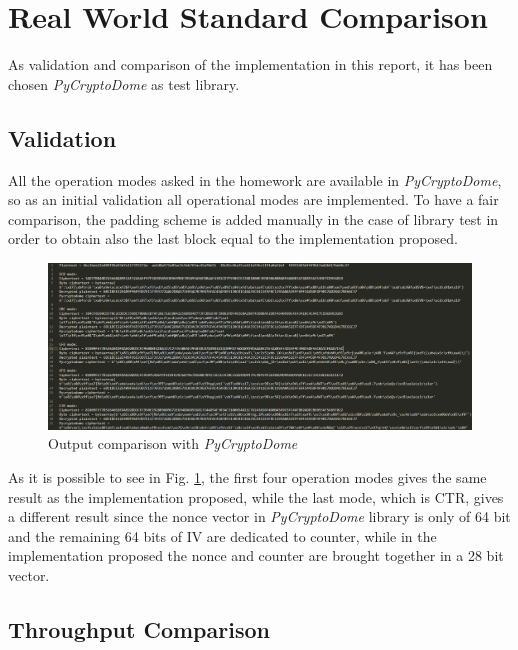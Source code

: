 \documentclass{article}
\begin{document}

\section{Real World Standard Comparison}

As validation and comparison of the implementation in this report, it has been chosen \textit{PyCryptoDome} as test library. 

\subsection{Validation}

All the operation modes asked in the homework are available in \textit{PyCryptoDome}, so as an initial validation all operational modes are implemented. To have a fair comparison, the padding scheme is added manually in the case of library test in order to obtain also the last block equal to the implementation proposed. 

\begin{figure}[H]
\centering
\includegraphics[width=1\linewidth]{images/output_comparison.png}
\caption{Output comparison with  \textit{PyCryptoDome}}
\label{fig:outputComparison}
\end{figure}

As it is possible to see in Fig. \ref{fig:outputComparison}, the first four operation modes gives the same result as the implementation proposed, while the last mode, which is CTR, gives a different result since the nonce vector in \textit{PyCryptoDome} library is only of 64 bit and the remaining 64 bits of IV are dedicated to counter, while in the implementation proposed the nonce and counter are brought together in a 28 bit vector.

\subsection{Throughput Comparison}






\end{document}
